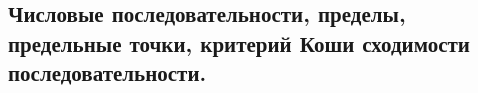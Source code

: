 \subsection{ Числовые последовательности, пределы, предельные точки, критерий Коши сходимости последовательности.}